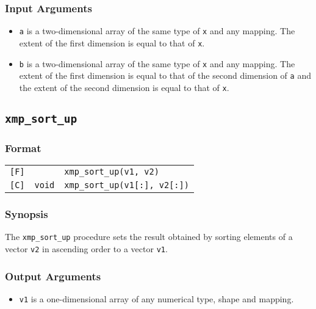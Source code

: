 \subsubsection*{Input Arguments}
\begin{itemize}
 \item {\tt a} is a two-dimensional array of the same type of {\tt x}
       and any mapping. The extent of the first dimension is equal to
       that of {\tt x}.
 \item {\tt b} is a two-dimensional array of the same type of {\tt x}
       and any mapping. The extent of the first dimension is equal to
       that of the second dimension of {\tt a} and the extent of the
       second dimension is equal to that of {\tt x}.
\end{itemize}


\subsection{\tt xmp\_sort\_up}

\subsubsection*{Format}

\begin{tabular}{lll}

\verb![F]!&            & {\tt xmp\_sort\_up(v1, v2)}\\

\verb![C]!& {\tt void} & {\tt xmp\_sort\_up(v1[:], v2[:])}\\

\end{tabular}

\subsubsection*{Synopsis}

The {\tt xmp\_sort\_up} procedure sets the result obtained by sorting
elements of a vector {\tt v2} in ascending order to a vector {\tt v1}.

\subsubsection*{Output Arguments}
\begin{itemize}
 \item {\tt v1} is a one-dimensional array of any numerical type,
       shape and mapping.
\end{itemize}

